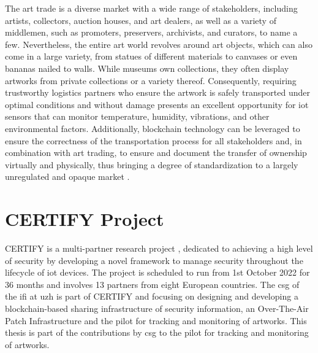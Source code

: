 The art trade is a diverse market with a wide range of stakeholders, including artists, collectors, auction houses, and art dealers, as well as a variety of middlemen, such as promoters, preservers, archivists, and curators, to name a few. Nevertheless, the entire art world revolves around art objects, which can also come in a large variety, from statues of different materials to canvases or even bananas nailed to walls. While museums own collections, they often display artworks from private collections or a variety thereof. Consequently, requiring trustworthy logistics partners who ensure the artwork is safely transported under optimal conditions and without damage presents an excellent opportunity for \gls{iot} sensors that can monitor temperature, humidity, vibrations, and other environmental factors. Additionally, blockchain technology can be leveraged to ensure the correctness of the transportation process for all stakeholders and, in combination with art trading, to ensure and document the transfer of ownership virtually and physically, thus bringing a degree of standardization to a largely unregulated and opaque market \cite{certify}.



\section{CERTIFY Project}
\label{sec:certify}
CERTIFY is a multi-partner research project \cite{certify}, dedicated to achieving a high level of security by developing a novel framework to manage security throughout the lifecycle of \gls{iot} devices. The project is scheduled to run from 1st October 2022 for 36 months and involves 13 partners from eight European countries. The \gls{csg} of the \gls{ifi} at \gls{uzh} is part of CERTIFY and focusing on designing and developing a blockchain-based sharing infrastructure of security information, an Over-The-Air Patch Infrastructure and the pilot for tracking and monitoring of artworks. This thesis is part of the contributions by \gls{csg} to the pilot for tracking and monitoring of artworks.

